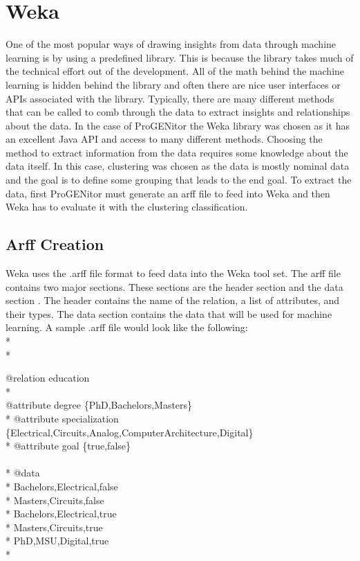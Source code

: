 \section{Weka}
\label{sect:weka}
One of the most popular ways of drawing insights from data through machine
learning is by using a predefined library.  This is because the library takes
much of the technical effort out of the development.  All of the math behind the
machine learning is hidden behind the library and often there are nice user
interfaces or APIs associated with the library.  Typically, there are many
different methods that can be called to comb through the data to extract
insights and relationships about the data.  In the case of ProGENitor the Weka
library was chosen as it has an excellent Java API and access to many different
methods.  Choosing the method to extract information from the data requires some
knowledge about the data itself.  In this case, clustering was chosen as the
data is mostly nominal data and the goal is to define some grouping that leads
to the end goal.  To extract the data, first ProGENitor must generate an
arff file to feed into Weka and then Weka has to evaluate it with the clustering
classification.

\subsection{Arff Creation}
Weka uses the .arff file format to feed data into the Weka tool set.  The arff
file contains two major sections.  These sections are the header section and the
data section \cite{arff}.  The header contains the name of the relation, a list
of attributes, and their types.  The data section contains the data that will
be used for machine learning.  A sample .arff file would look like the
following:\\*
\\*
\begin{tt}
\begin{footnotesize}
@relation education\\*
\\
@attribute degree \{PhD,Bachelors,Masters\}\\*
@attribute specialization
\{Electrical,Circuits,Analog,Computer\newline \indent Architecture,Digital\}\\*
@attribute goal \{true,false\}\\ \\* @data\\*
Bachelors,Electrical,false\\*
Masters,Circuits,false\\*
Bachelors,Electrical,true\\*
Masters,Circuits,true\\*
PhD,MSU,Digital,true\\*
\end{footnotesize}
\end{tt}

